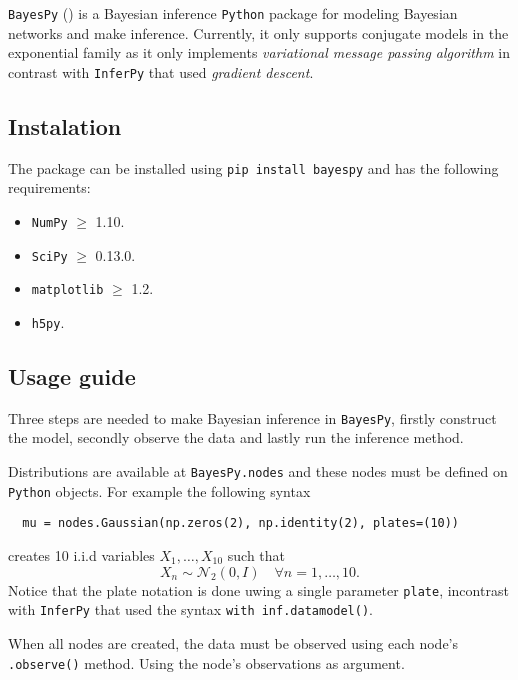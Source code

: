 
\texttt{BayesPy} (\cite{BayesPy}) is a Bayesian inference \texttt{Python} package for modeling Bayesian networks and make inference. Currently, it only supports conjugate models in the exponential family as it only implements \emph{variational message passing algorithm} in contrast with \texttt{InferPy} that used \emph{gradient descent}.

\subsection{Instalation}

The package can be installed using \texttt{pip install bayespy} and has the following requirements:
\begin{itemize}
  \item \texttt{NumPy} \(\geq\) 1.10.
  \item \texttt{SciPy} \(\geq\) 0.13.0.
  \item \texttt{matplotlib} \(\geq\) 1.2.
  \item \texttt{h5py}.
\end{itemize}

\subsection{Usage guide}

Three steps are needed to make Bayesian inference in \texttt{BayesPy}, firstly construct the model, secondly observe the data and lastly run the inference method.

Distributions are available at \texttt{BayesPy.nodes} and these nodes must be defined on \texttt{Python} objects. For example the following syntax
\begin{verbatim}
  mu = nodes.Gaussian(np.zeros(2), np.identity(2), plates=(10))
\end{verbatim}
creates 10 i.i.d variables \(X_{1},\dots,X_{10}\)  such that
\[
  X_{n} \sim \mathcal{N}_{2}(0, I) \quad \forall n =1,\dots,10.
\]
Notice that the plate notation is done uwing a single parameter \texttt{plate}, incontrast with \texttt{InferPy} that used the syntax \texttt{with inf.datamodel()}.

When all nodes are created, the data must be observed using each node's \texttt{.observe()} method. Using the node's observations as argument.


